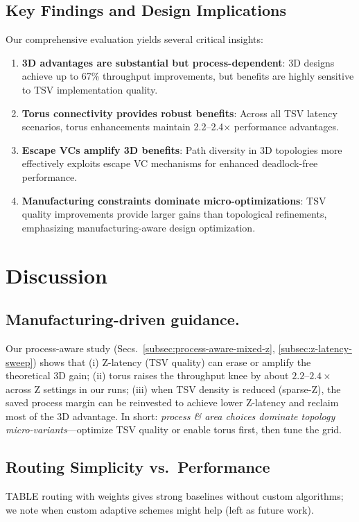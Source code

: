 \documentclass[11pt]{article}
\begin{document}
\subsection{Key Findings and Design Implications}

Our comprehensive evaluation yields several critical insights:

\begin{enumerate}[leftmargin=1.5em]
    \item \textbf{3D advantages are substantial but process-dependent}: 3D designs achieve up to 67\% throughput improvements, but benefits are highly sensitive to TSV implementation quality.
    
    \item \textbf{Torus connectivity provides robust benefits}: Across all TSV latency scenarios, torus enhancements maintain 2.2--2.4× performance advantages.
    
    \item \textbf{Escape VCs amplify 3D benefits}: Path diversity in 3D topologies more effectively exploits escape VC mechanisms for enhanced deadlock-free performance.
    
    \item \textbf{Manufacturing constraints dominate micro-optimizations}: TSV quality improvements provide larger gains than topological refinements, emphasizing manufacturing-aware design optimization.
\end{enumerate}
\section{Discussion}
\subsection{Manufacturing-driven guidance.}
Our process-aware study (Secs.~\ref{subsec:process-aware-mixed-z}, \ref{subsec:z-latency-sweep})
shows that (i) Z-latency (TSV quality) can erase or amplify the theoretical 3D gain;
(ii) torus raises the throughput knee by about $2.2$--$2.4\times$ across Z settings in our runs;
(iii) when TSV density is reduced (sparse-Z), the saved process margin can be reinvested to
achieve lower Z-latency and reclaim most of the 3D advantage. In short: \emph{process \& area
choices dominate topology micro-variants}—optimize TSV quality or enable torus first, then tune the grid.


\subsection{Routing Simplicity vs.\ Performance}
TABLE routing with weights gives strong baselines without custom algorithms; we note when custom adaptive schemes might help (left as future work).
\end{document}
